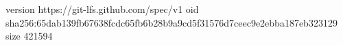 version https://git-lfs.github.com/spec/v1
oid sha256:65dab139fb67638fcdc65fb6b28b9a9cd5f31576d7ceec9e2ebba187eb323129
size 421594
